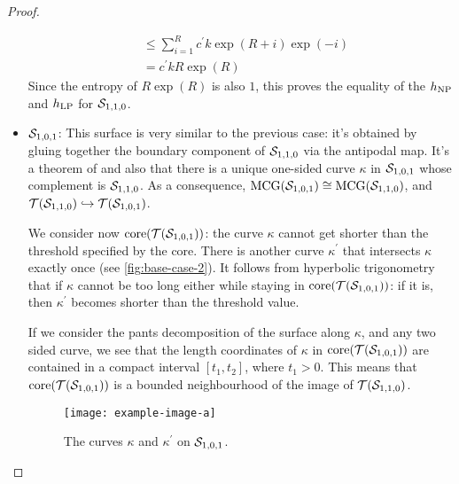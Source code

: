 \documentclass[12pt, reqno]{amsart}
\begin{document}
\begin{proof}
\begin{itemize}
\begin{align*}
                                     &\leq \sum_{i=1}^R c^{\prime}k \exp(R+i) \exp(-i) \\
                                     &= c^{\prime}k R \exp(R)
    \end{align*}
    Since the entropy of $R \exp(R)$ is also $1$, this proves the equality of the $h_{\mathrm{NP}}$ and $h_{\mathrm{LP}}$ for $\mathcal{S}_{1,1,0}$.
  \item $\mathcal{S}_{1,0,1}$: This surface is very similar to the previous case: it's obtained by gluing together the boundary component of $\mathcal{S}_{1,1,0}$ via the antipodal map.
    It's a theorem of \textcite{scharlemann1982complex} and also \textcite{gendulphe2017whats} that there is a unique one-sided curve $\kappa$ in $\mathcal{S}_{1,0,1}$ whose complement is $\mathcal{S}_{1,1,0}$.
    As a consequence, $\mathrm{MCG}(\mathcal{S}_{1,0,1}) \cong \mathrm{MCG}(\mathcal{S}_{1,1,0})$, and $\mathcal{T}(\mathcal{S}_{1,1,0}) \hookrightarrow \mathcal{T}(\mathcal{S}_{1,0,1})$.

    We consider now $\mathrm{core}(\mathcal{T}(\mathcal{S}_{1,0,1}))$: the curve $\kappa$ cannot get shorter than the threshold specified by the core.
    There is another curve $\kappa^{\prime}$ that intersects $\kappa$ exactly once (see \autoref{fig:base-case-2}).
    It follows from hyperbolic trigonometry that if $\kappa$ cannot be too long either while staying in $\mathrm{core}(\mathcal{T}(\mathcal{S}_{1,0,1}))$: if it is, then $\kappa^{\prime}$ becomes shorter than the threshold value.

    If we consider the pants decomposition of the surface along $\kappa$, and any two sided curve, we see that the length coordinates of $\kappa$ in $\mathrm{core}(\mathcal{T}(\mathcal{S}_{1,0,1}))$ are contained in a compact interval $[t_1, t_2]$, where $t_1 > 0$.
    This means that $\mathrm{core}(\mathcal{T}(\mathcal{S}_{1,0,1}))$ is a bounded neighbourhood of the image of $\mathcal{T}(\mathcal{S}_{1,1,0})$.
    \begin{figure}[h]
      \centering
      \texttt{[image: example-image-a]}
      \caption{The curves $\kappa$ and $\kappa^{\prime}$ on $\mathcal{S}_{1,0,1}$.}
      \label{fig:base-case-2}
    \end{figure}


\end{itemize}
\end{proof}
\end{document}
